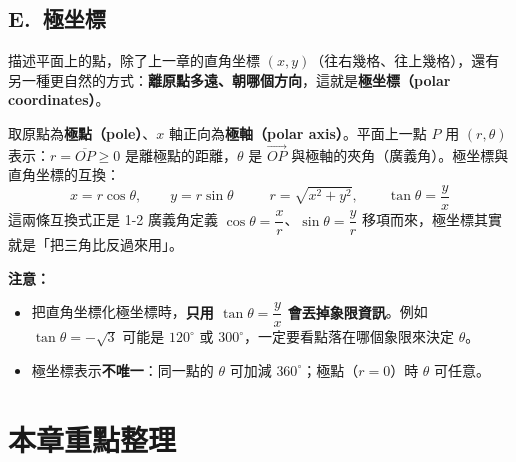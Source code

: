 \documentclass[11pt]{article}
\begin{document}
\subsection*{\sffamily E.\ 極坐標}

描述平面上的點，除了上一章的直角坐標 $(x,y)$（往右幾格、往上幾格），還有另一種更自然的方式：\textbf{離原點多遠、朝哪個方向}，這就是\textbf{極坐標（polar coordinates）}。

取原點為\textbf{極點（pole）}、$x$ 軸正向為\textbf{極軸（polar axis）}。平面上一點 $P$ 用 $(r,\theta)$ 表示：$r=\overline{OP}\ge0$ 是離極點的距離，$\theta$ 是 $\overrightarrow{OP}$ 與極軸的夾角（廣義角）。極坐標與直角坐標的互換：
$$\boxed{\;x=r\cos\theta,\qquad y=r\sin\theta\;}\qquad\boxed{\;r=\sqrt{x^2+y^2},\qquad \tan\theta=\frac{y}{x}\;}$$
這兩條互換式正是 1-2 廣義角定義 $\cos\theta=\dfrac{x}{r}$、$\sin\theta=\dfrac{y}{r}$ 移項而來，極坐標其實就是「把三角比反過來用」。


\textbf{注意：}
\begin{itemize}\setlength{\itemsep}{1pt}
\item 把直角坐標化極坐標時，\textbf{只用 $\tan\theta=\dfrac{y}{x}$ 會丟掉象限資訊}。例如 $\tan\theta=-\sqrt3$ 可能是 $120^\circ$ 或 $300^\circ$，一定要看點落在哪個象限來決定 $\theta$。
\item 極坐標表示\textbf{不唯一}：同一點的 $\theta$ 可加減 $360^\circ$；極點（$r=0$）時 $\theta$ 可任意。
\end{itemize}

\section*{\sffamily 本章重點整理}
\end{document}
